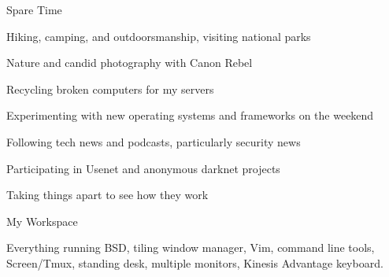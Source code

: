 \documentclass[10pt,letterpaper]{article}
\begin{document}
\begin{itemize*}
    \item Spare Time
        \begin{itemize*}
            \item Hiking, camping, and outdoorsmanship, visiting national parks
            \item Nature and candid photography with Canon Rebel
            \item Recycling broken computers for my servers
            \item Experimenting with new operating systems and frameworks on the
                weekend
            \item Following tech news and podcasts, particularly security news
            \item Participating in Usenet and anonymous darknet projects
            \item Taking things apart to see how they work
        \end{itemize*}
    \item My Workspace
        \begin{itemize*}
            \item Everything running BSD, tiling window manager, Vim, command
                line tools, Screen/Tmux, standing desk, multiple monitors,
                Kinesis Advantage keyboard.
        \end{itemize*}
\end{itemize*}
\end{document}
